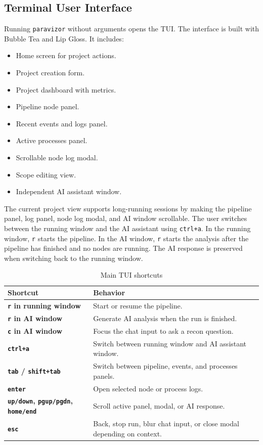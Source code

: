 \documentclass[a4paper,12pt]{article}
\begin{document}
\subsection{Terminal User Interface}

Running \texttt{paravizor} without arguments opens the TUI. The interface is built with Bubble Tea and Lip Gloss. It includes:

\begin{itemize}
    \item Home screen for project actions.
    \item Project creation form.
    \item Project dashboard with metrics.
    \item Pipeline node panel.
    \item Recent events and logs panel.
    \item Active processes panel.
    \item Scrollable node log modal.
    \item Scope editing view.
    \item Independent AI assistant window.
\end{itemize}

The current project view supports long-running sessions by making the pipeline panel, log panel, node log modal, and AI window scrollable. The user switches between the running window and the AI assistant using \texttt{ctrl+a}. In the running window, \texttt{r} starts the pipeline. In the AI window, \texttt{r} starts the analysis after the pipeline has finished and no nodes are running. The AI response is preserved when switching back to the running window.

\begin{table}[H]
    \centering
    \begin{tabularx}{\textwidth}{>{\bfseries}p{4cm}X}
        \toprule
        Shortcut & Behavior \\
        \midrule
        \texttt{r} in running window & Start or resume the pipeline. \\
        \texttt{r} in AI window & Generate AI analysis when the run is finished. \\
        \texttt{c} in AI window & Focus the chat input to ask a recon question. \\
        \texttt{ctrl+a} & Switch between running window and AI assistant window. \\
        \texttt{tab} / \texttt{shift+tab} & Switch between pipeline, events, and processes panels. \\
        \texttt{enter} & Open selected node or process logs. \\
        \texttt{up/down}, \texttt{pgup/pgdn}, \texttt{home/end} & Scroll active panel, modal, or AI response. \\
        \texttt{esc} & Back, stop run, blur chat input, or close modal depending on context. \\
        \bottomrule
    \end{tabularx}
    \caption{Main TUI shortcuts}
    \label{tab:tui-shortcuts}
\end{table}
\end{document}
